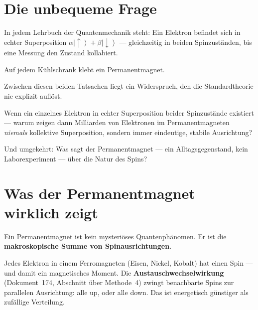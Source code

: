 
\providecommand{\ket}[1]{\left|#1\right\rangle}
\providecommand{\bra}[1]{\left\langle#1\right|}
\providecommand{\braket}[2]{\left\langle#1\middle|#2\right\rangle}

\section{Die unbequeme Frage}
\label{sec:unbequeme-frage}

In jedem Lehrbuch der Quantenmechanik steht:
Ein Elektron befindet sich in echter Superposition
$\alpha\ket{\uparrow} + \beta\ket{\downarrow}$ ---
gleichzeitig in beiden Spinzuständen,
bis eine Messung den Zustand kollabiert.

Auf jedem Kühlschrank klebt ein Permanentmagnet.

Zwischen diesen beiden Tatsachen liegt ein Widerspruch,
den die Standardtheorie nie explizit auflöst.

\begin{significance}
Wenn ein einzelnes Elektron in echter Superposition
beider Spinzustände existiert ---
warum zeigen dann Milliarden von Elektronen
im Permanentmagneten \emph{niemals} kollektive Superposition,
sondern immer eindeutige, stabile Ausrichtung?

Und umgekehrt:
Was sagt der Permanentmagnet --- ein Alltagsgegenstand,
kein Laborexperiment --- über die Natur des Spins?
\end{significance}

\section{Was der Permanentmagnet wirklich zeigt}
\label{sec:permanentmagnet}

Ein Permanentmagnet ist kein mysteriöses Quantenphänomen.
Er ist die \textbf{makroskopische Summe von Spinausrichtungen}.

Jedes Elektron in einem Ferromagneten (Eisen, Nickel, Kobalt)
hat einen Spin --- und damit ein magnetisches Moment.
Die \textbf{Austauschwechselwirkung} (Dokument~174,
Abschnitt über Methode~4) zwingt benachbarte Spins
zur parallelen Ausrichtung: alle up, oder alle down.
Das ist energetisch günstiger als zufällige Verteilung.

